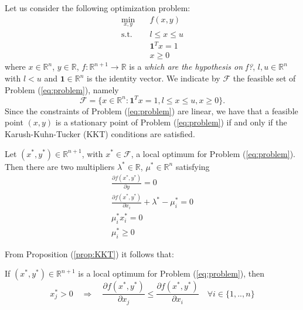 Let us consider the following optimization problem:
\begin{subequations}\label{eq:problem} 
\begin{align}
\min_{x,y} & \quad f(x,y)  \\
\text{s.t.} & \quad l \leq x \leq u \\
& \quad \mathbf{1}^T x = 1 \\
& \quad x \geq 0
\end{align}
\end{subequations}
where $x \in \mathbb{R}^n$, $y \in \mathbb{R}$, $f:\mathbb{R}^{n+1} \rightarrow \mathbb{R}$ is a \textit{which are the hypothesis on f?}, $l, u \in \mathbb{R}^n$ with $l < u$ and $\mathbf{1} \in \mathbb{R}^n$ is the identity vector. We indicate by $\mathcal{F}$ the feasible set of Problem (\ref{eq:problem}), namely
\begin{equation}
\mathcal{F} = \{x \in \mathbb{R}^n : \mathbf{1}^T x = 1, l \leq x \leq u, x \geq 0 \}.
\end{equation}
Since the constraints of Problem (\ref{eq:problem}) are linear, we have that a feasible point $(x,y)$ is a stationary point of Problem (\ref{eq:problem}) if and only if the Karush-Kuhn-Tucker (KKT) conditions are satisfied.

\begin{proposition}\label{prop:KKT}
Let $(x^*,y^*) \in \mathbb{R}^{n+1}$, with $x^* \in \mathcal{F}$, a local optimum for Problem (\ref{eq:problem}). Then there are two multipliers $\lambda^* \in \mathbb{R}$, $\mu^* \in \mathbb{R}^n$ satisfying
\begin{subequations}
\begin{align}
\frac{\partial f(x^*, y^*)}{\partial y} = 0 \\
\frac{\partial f(x^*, y^*)}{\partial x_i} +\lambda^* - \mu^*_i =0 \\
\mu^*_ix^{*}_i=0 \\
\mu^*_i\ge0
\end{align}
\end{subequations}
\end{proposition}

\hspace{-1.8em} From Proposition (\ref{prop:KKT}) it follows that:

\begin{corollary}
If $(x^*, y^*) \in \mathbb{R}^{n+1}$ is a local optimum for Problem (\ref{eq:problem}), then
\begin{equation}
x_j^* > 0 \quad \Rightarrow \quad \frac{\partial f(x^*, y^*)}{\partial x_j} \leq \frac{\partial f(x^*, y^*)}{\partial x_i} \quad \forall i \in \{1, .., n\}
\end{equation}
\end{corollary}